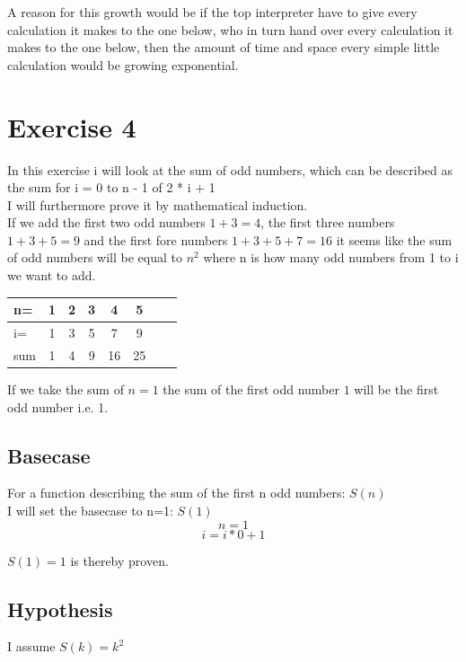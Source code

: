 \documentclass{article}
\begin{document}
A reason for this growth would be if the top interpreter have to give every calculation it makes to the one below, who in turn hand over every calculation it makes to the one below, then the amount of time and space every simple little calculation would be growing exponential.

\section*{Exercise 4}
In this exercise i will look at the sum of odd numbers, which can be described as the sum for i = 0 to n - 1 of 2 * i + 1\\
I will furthermore prove it by mathematical induction.\\

If we add the first two odd numbers $ 1+3=4 $, the first three numbers $ 1+3+5=9 $ and the first fore numbers $ 1+3+5+7=16 $ it seems like the sum of odd numbers will be equal to  $ n^2 $ where n is how many odd numbers from 1 to i we want to add.\\

\begin{tabular}{l*{6}{c}r}\hline
  n= & 1 & 2 & 3 & 4 & 5 \\ \hline
  i= & 1 & 3 & 5 & 7 & 9 \\ \hline
  sum & 1 & 4 & 9 & 16 & 25 \\\hline
\end{tabular}

If we take the sum of $ n=1 $ the sum of the first odd number $1$ will be the first odd number i.e. 1.

\subsection*{Basecase}
For a function describing the sum of the first n odd numbers: $ S(n) $\\
I will set the basecase to n=1: $ S(1) $\\

$$ n=1 $$
$$ i=i*0+1 $$

$ S(1)=1 $ is thereby proven.

\subsection*{Hypothesis}
I assume $ S(k)=k^2 $
\end{document}
